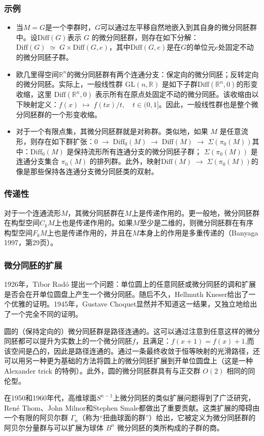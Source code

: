 \subsubsection{示例}
\begin{itemize}
\item 当$M = G$是一个李群时，$G$可以通过左平移自然地嵌入到其自身的微分同胚群中。设$\text{Diff}(G)$表示 $G$ 的微分同胚群，则存在如下分解：$\text{Diff}(G) \;\simeq\; G \times \text{Diff}(G, e)$，其中$\text{Diff}(G, e)$是在$G$的单位元$e$处固定不动的微分同胚子群。
\item 欧几里得空间$\mathbb{R}^n$的微分同胚群有两个连通分支：保定向的微分同胚；反转定向的微分同胚。实际上，一般线性群 $\text{GL}(n, \mathbb{R})$ 是如下子群$
\text{Diff}(\mathbb{R}^n, 0)$的形变收缩，这里 $\text{Diff}(\mathbb{R}^n, 0)$ 表示所有在原点处固定不动的微分同胚。该收缩由以下映射定义：$f(x) \;\mapsto\; f(tx)/t, \quad t \in (0, 1]$。因此，一般线性群也是整个微分同胚群的一个形变收缩。
\item 对于一个有限点集，其微分同胚群就是对称群。类似地，如果 $M$ 是任意流形，则存在如下群扩张：$0 \;\longrightarrow\; \text{Diff}_0(M)\;\longrightarrow\; \text{Diff}(M)\;\longrightarrow\; \Sigma(\pi_0(M))$其中：$\text{Diff}_0(M)$ 是保持流形所有连通分支的微分同胚子群；
$\Sigma(\pi_0(M))$ 是连通分支集合 $\pi_0(M)$ 的排列群。此外，映射$\text{Diff}(M) \;\to\; \Sigma(\pi_0(M))$的像是那些保持各连通分支微分同胚类的双射。
\end{itemize}
\subsubsection{传递性}
对于一个连通流形$M$，其微分同胚群在$M$上是传递作用的。更一般地，微分同胚群在构型空间$C_kM$上也是传递作用的。如果$M$至少是二维的，则微分同胚群在有序构型空间$F_kM$上也是传递作用的，并且在$M$本身上的作用是多重传递的（Banyaga 1997，第29页）。
\subsubsection{微分同胚的扩展}
1926年，Tibor Radó 提出一个问题：单位圆上的任意同胚或微分同胚的调和扩展是否会在开单位圆盘上产生一个微分同胚。随后不久，Hellmuth Kneser给出了一个优雅的证明。1945年，Gustave Choquet显然并不知道这一结果，又独立地给出了一个完全不同的证明。

圆的（保持定向的）微分同胚群是路径连通的。这可以通过注意到任意这样的微分同胚都可以提升为实数上的一个微分同胚$f$，且满足：$f(x+1) = f(x) + 1$,而该空间是凸的，因此是路径连通的。通过一条最终收敛于恒等映射的光滑路径，还可以用另一种更为基础的方法将圆上的微分同胚扩展到开单位圆盘上（这是一种 Alexander trick 的特例）。此外，圆的微分同胚群具有与正交群 $O(2)$ 相同的同伦型。

在1950和1960年代，高维球面$S^{n-1}$上微分同胚的类似扩展问题得到了广泛研究，René Thom、John Milnor和Stephen Smale都做出了重要贡献。这类扩展的障碍由一个有限的阿贝尔群 $\Gamma_n$（称为“扭曲球面的群”）给出，它被定义为微分同胚群的阿贝尔分量群与可以扩展为球体 $B^n$ 微分同胚的类所构成的子群的商。
